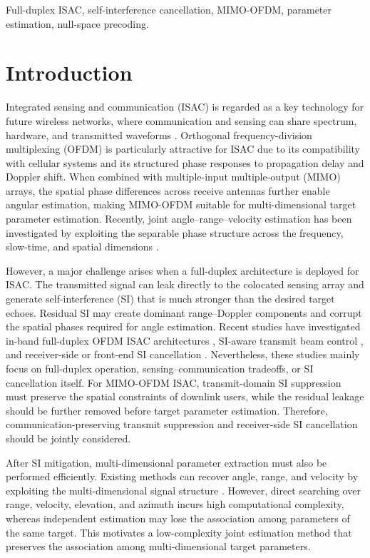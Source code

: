 \documentclass[conference]{IEEEtran}
\begin{document}
\begin{IEEEkeywords}
Full-duplex ISAC, self-interference cancellation, MIMO-OFDM, parameter estimation, null-space precoding.
\end{IEEEkeywords}

\section{Introduction}\label{sec:introduction}
Integrated sensing and communication (ISAC) is regarded as a key technology for future wireless networks, where communication and sensing can share spectrum, hardware, and transmitted waveforms \cite{liu2022isac,wei2023signals,zhang2022survey}. Orthogonal frequency-division multiplexing (OFDM) is particularly attractive for ISAC due to its compatibility with cellular systems and its structured phase responses to propagation delay and Doppler shift. When combined with multiple-input multiple-output (MIMO) arrays, the spatial phase differences across receive antennas further enable angular estimation, making MIMO-OFDM suitable for multi-dimensional target parameter estimation. Recently, joint angle--range--velocity estimation has been investigated by exploiting the separable phase structure across the frequency, slow-time, and spatial dimensions \cite{xiao2024joint}.

However, a major challenge arises when a full-duplex architecture is deployed for ISAC. The transmitted signal can leak directly to the colocated sensing array and generate self-interference (SI) that is much stronger than the desired target echoes. Residual SI may create dominant range--Doppler components and corrupt the spatial phases required for angle estimation. Recent studies have investigated in-band full-duplex OFDM ISAC architectures \cite{duan2025ibfd}, SI-aware transmit beam control \cite{zhou2025multibeam}, and receiver-side or front-end SI cancellation \cite{yu2024photonics,du2025survey}. Nevertheless, these studies mainly focus on full-duplex operation, sensing--communication tradeoffs, or SI cancellation itself. For MIMO-OFDM ISAC, transmit-domain SI suppression must preserve the spatial constraints of downlink users, while the residual leakage should be further removed before target parameter estimation. Therefore, communication-preserving transmit suppression and receiver-side SI cancellation should be jointly considered.

After SI mitigation, multi-dimensional parameter extraction must also be performed efficiently. Existing methods can recover angle, range, and velocity by exploiting the multi-dimensional signal structure \cite{xiao2024joint}. However, direct searching over range, velocity, elevation, and azimuth incurs high computational complexity, whereas independent estimation may lose the association among parameters of the same target. This motivates a low-complexity joint estimation method that preserves the association among multi-dimensional target parameters.
\end{document}
